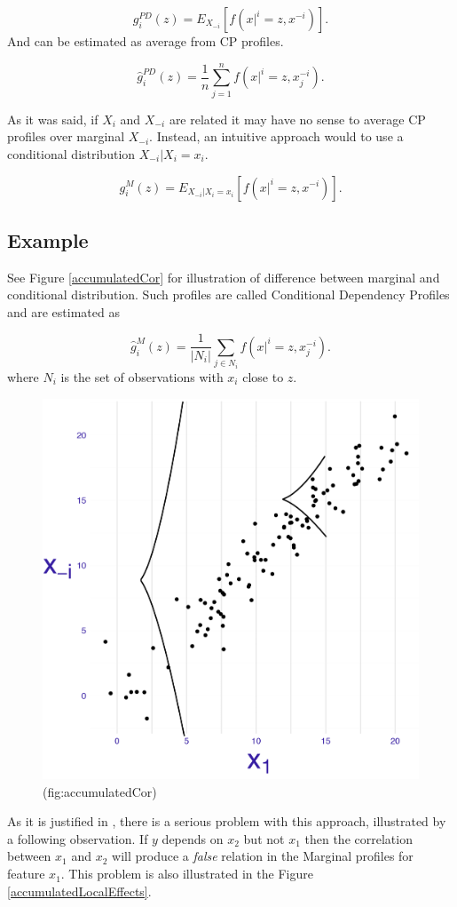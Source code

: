 \documentclass[12pt,]{krantz}
\theoremstyle{definition}
\theoremstyle{definition}
\theoremstyle{definition}
\theoremstyle{remark}
\begin{document}
\[
g^{PD}_i(z) = E_{X_{-i}}[ f(x|^i = z, x^{-i}) ].
\] And can be estimated as average from CP profiles.

\[
\hat g^{PD}_i(z) = \frac{1}{n} \sum_{j=1}^{n} f(x|^i = z, x_j^{-i}).
\]

As it was said, if \(X_i\) and \(X_{-i}\) are related it may have no
sense to average CP profiles over marginal \(X_{-i}\). Instead, an
intuitive approach would to use a conditional distribution
\(X_{-i}|X_i=x_i\).

\[
g^{M}_i(z) = E_{X_{-i}|X_i=x_i}[ f(x|^i = z, x^{-i}) ].
\]

\hypertarget{example}{%
\subsection{Example}\label{example}}

See Figure \ref{accumulatedCor} for illustration of difference between
marginal and conditional distribution. Such profiles are called
Conditional Dependency Profiles and are estimated as

\[
\hat g^{M}_i(z) = \frac{1}{|N_i|} \sum_{j\in N_i} f(x|^i = z, x_j^{-i}). 
\] where \(N_i\) is the set of observations with \(x_i\) close to \(z\).

\begin{figure}

{\centering \includegraphics[width=0.4\linewidth]{figure/CP_ALE_2} 

}

\caption{(fig:accumulatedCor) }\label{fig:accumulatedCor}
\end{figure}

As it is justified in \citep{R-ALEPlot}, there is a serious problem with
this approach, illustrated by a following observation. If \(y\) depends
on \(x_2\) but not \(x_1\) then the correlation between \(x_1\) and
\(x_2\) will produce a \emph{false} relation in the Marginal profiles
for feature \(x_1\). This problem is also illustrated in the Figure
\ref{accumulatedLocalEffects}.
\end{document}
